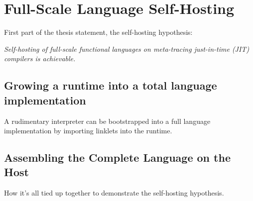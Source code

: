 \chapter{Full-Scale Language Self-Hosting}

\begin{mainpoint}

First part of the thesis statement, the self-hosting hypothesis:

\textit{Self-hosting of full-scale functional languages on meta-tracing just-in-time (JIT) compilers is achievable.}
\end{mainpoint}


\section{Growing a runtime into a total language implementation}

    \begin{mainpoint}
        A rudimentary interpreter can be bootstrapped into a full language implementation by importing linklets into the runtime.
    \end{mainpoint}

\section{Assembling the Complete Language on the Host} 

    \begin{mainpoint}
        How it's all tied up together to demonstrate the self-hosting hypothesis.
    \end{mainpoint}
	